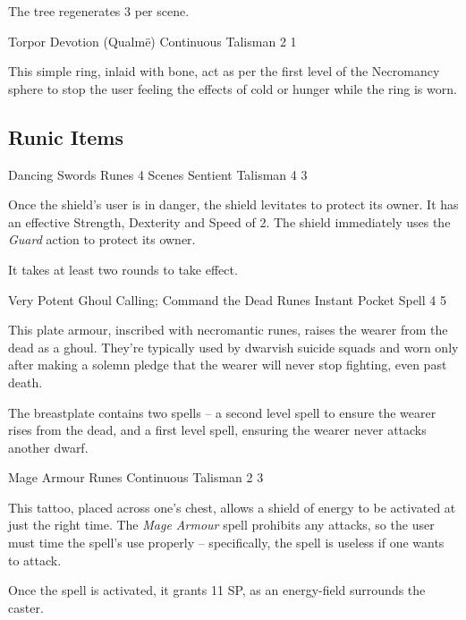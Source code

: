 \begin{multicols}{2}
The tree regenerates 3 per scene.

	{Torpor}%
	{Devotion (Qualm\"{e})}%
	{Continuous}%
	{Talisman}%
	{2}%
	{1}\label{ring_asphyxiation}%

This simple ring, inlaid with bone, act as per the first level of the Necromancy sphere to stop the user feeling the effects of cold or hunger while the ring is worn.

\subsection{Runic Items}

	{Dancing Swords}%
	{Runes}%
	{4 Scenes}%
	{Sentient Talisman}%
	{4}%
	{3}%

Once the shield's user is in danger, the shield levitates to protect its owner.
It has an effective Strength, Dexterity and Speed of 2.
The shield immediately uses the \textit{Guard} action to protect its owner.

It takes at least two rounds to take effect.

	{Very Potent Ghoul Calling; Command the Dead}%
	{Runes}%
	{Instant}%
	{Pocket Spell}%
	{4}%
	{5}%

\label{eternalwarriorarmour}

This plate armour, inscribed with necromantic runes, raises the wearer from the dead as a ghoul.
They're typically used by dwarvish suicide squads and worn only after making a solemn pledge that the wearer will never stop fighting, even past death.

The breastplate contains two spells -- a second level spell to ensure the wearer rises from the dead, and a first level spell, ensuring the wearer never attacks another dwarf.

	{Mage Armour}%
	{Runes}%
	{Continuous}%
	{Talisman}%
	{2}%
	{3}%

This tattoo, placed across one's chest, allows a shield of energy to be activated at just the right time.
The \textit{Mage Armour} spell prohibits any attacks, so the user must time the spell's use properly -- specifically, the spell is useless if one wants to attack.

Once the spell is activated, it grants 11 SP, as an energy-field surrounds the caster.


\end{multicols}
